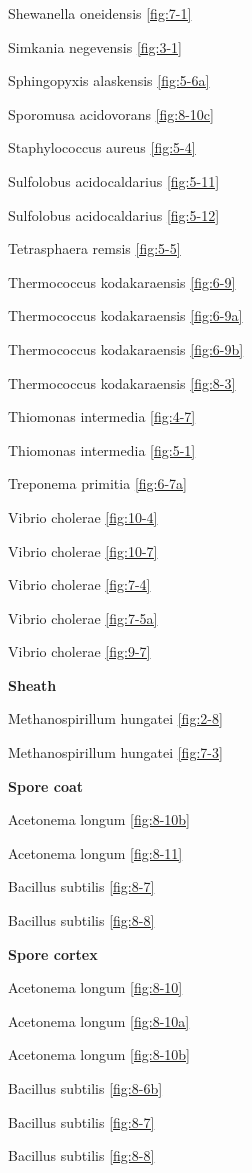 \documentclass[]{tufte-book}
\begin{document}
Shewanella oneidensis \ref{fig:7-1}

Simkania negevensis \ref{fig:3-1}

Sphingopyxis alaskensis \ref{fig:5-6a}

Sporomusa acidovorans \ref{fig:8-10c}

Staphylococcus aureus \ref{fig:5-4}

Sulfolobus acidocaldarius \ref{fig:5-11}

Sulfolobus acidocaldarius \ref{fig:5-12}

Tetrasphaera remsis \ref{fig:5-5}

Thermococcus kodakaraensis \ref{fig:6-9}

Thermococcus kodakaraensis \ref{fig:6-9a}

Thermococcus kodakaraensis \ref{fig:6-9b}

Thermococcus kodakaraensis \ref{fig:8-3}

Thiomonas intermedia \ref{fig:4-7}

Thiomonas intermedia \ref{fig:5-1}

Treponema primitia \ref{fig:6-7a}

Vibrio cholerae \ref{fig:10-4}

Vibrio cholerae \ref{fig:10-7}

Vibrio cholerae \ref{fig:7-4}

Vibrio cholerae \ref{fig:7-5a}

Vibrio cholerae \ref{fig:9-7}

\textbf{Sheath}

Methanospirillum hungatei \ref{fig:2-8}

Methanospirillum hungatei \ref{fig:7-3}

\textbf{Spore coat}

Acetonema longum \ref{fig:8-10b}

Acetonema longum \ref{fig:8-11}

Bacillus subtilis \ref{fig:8-7}

Bacillus subtilis \ref{fig:8-8}

\textbf{Spore cortex}

Acetonema longum \ref{fig:8-10}

Acetonema longum \ref{fig:8-10a}

Acetonema longum \ref{fig:8-10b}

Bacillus subtilis \ref{fig:8-6b}

Bacillus subtilis \ref{fig:8-7}

Bacillus subtilis \ref{fig:8-8}
\end{document}
